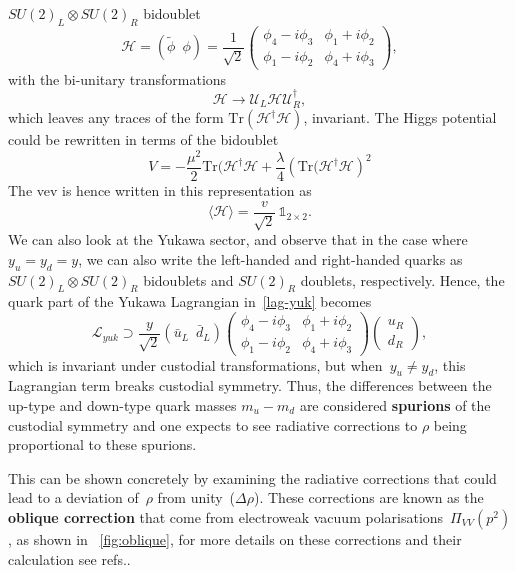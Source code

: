 $SU(2)_L \otimes SU(2)_R$ bidoublet 
\begin{equation}
	\mathcal{H} =(\tilde{\phi} \,\,\, \phi) = \frac{1}{\sqrt{2}}\begin{pmatrix}
		\phi_4-i\phi_3 & \phi_1+i\phi_2 \\
		\phi_1-i\phi_2 & \phi_4+i\phi_3
	\end{pmatrix},
\end{equation}
with the bi-unitary transformations
\begin{equation}
	\mathcal{H} \longrightarrow \mathcal{U}_L \mathcal{H} \mathcal{U}^\dagger_R,
\end{equation}
which leaves any traces of the form $\mathrm{Tr}(\mathcal{H}^\dagger\mathcal{H})$, invariant. The Higgs potential could be rewritten in terms of the bidoublet 
\begin{equation}
	V = -\frac{\mu^2}{2} \mathrm{Tr}(\mathcal{H}^\dagger\mathcal{H} + \frac{\lambda}{4}\left(  \mathrm{Tr}(\mathcal{H}^\dagger\mathcal{H} \right) ^2
\end{equation}
The vev is hence written in this representation as 
\begin{equation}
	\langle \mathcal{H} \rangle  = \frac{v}{\sqrt{2}}\, \mathbb{1}_{2\times 2}.
\end{equation}
We can also look at the Yukawa sector, and observe that in the case where $ y_u =y_d =y $, we can also write the left-handed and right-handed quarks  as $SU(2)_L \otimes SU(2)_R$  bidoublets and $SU(2)_R$ doublets, respectively. Hence, the quark part of the Yukawa Lagrangian in~\eqref{lag-yuk} becomes
\begin{equation}
	\mathcal{L}_{yuk} \supset \frac{y}{\sqrt{2}}  (\bar u_L\,\,\, \bar d_L)  \begin{pmatrix}
		\phi_4-i\phi_3 & \phi_1+i\phi_2 \\
		\phi_1-i\phi_2 & \phi_4+i\phi_3  
	\end{pmatrix}  \begin{pmatrix}  u_R \\ d_R	\end{pmatrix} ,
\end{equation}
which is invariant under custodial transformations, but when~$ y_u \neq y_d$, this Lagrangian term breaks custodial symmetry. Thus, the differences between the up-type and down-type quark masses $m_u-m_d$ are considered \textbf{spurions} of the  custodial symmetry and one expects to see radiative corrections to $\rho$ being proportional to these spurions.
\par This can be shown concretely by examining the radiative corrections that could lead to a deviation of~$\rho$ from unity~($\Delta \rho$). These corrections are known as the \textbf{oblique correction} that come from electroweak vacuum polarisations~$\Pi_{VV}(p^2)$, as shown in ~\autoref{fig:oblique}, for more details on these corrections and their calculation see refs..~\cite{schwartz2014quantum,peskin1995introduction} \\
